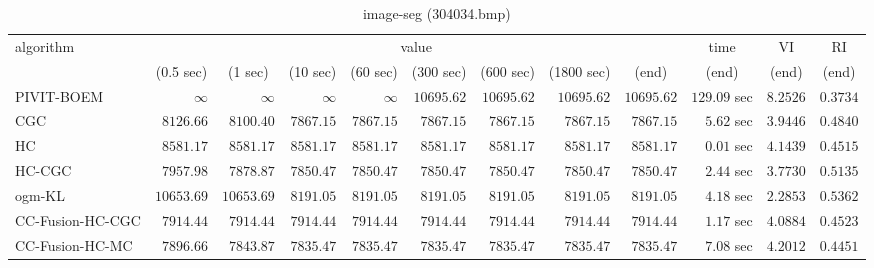 \begin{table}[H]
\scriptsize
\centering
\caption{image-seg (304034.bmp)}
\label{tab:anytimetable-image-seg-304034.bmp}
\begin{tabular}{lrrrrrrrrrrr}
\toprule
           algorithm &                                   \multicolumn{8}{c}{value} & \multicolumn{1}{c}{time}    & \multicolumn{1}{c}{VI}  & \multicolumn{1}{c}{RI} \\  
\cmidrule(lr){2-9}\cmidrule(lr){10-10} \cmidrule(lr){11-11} \cmidrule(lr){12-12}   
                     & \multicolumn{1}{c}{(0.5 sec)} & \multicolumn{1}{c}{(1 sec)} & \multicolumn{1}{c}{(10 sec)} & \multicolumn{1}{c}{(60 sec)} & \multicolumn{1}{c}{(300 sec)} & \multicolumn{1}{c}{(600 sec)} & \multicolumn{1}{c}{(1800 sec)} & \multicolumn{1}{c}{(end)} & \multicolumn{1}{c}{(end)}    & \multicolumn{1}{c}{(end)}   & \multicolumn{1}{c}{(end)}  \\ \midrule 
          PIVIT-BOEM & $\infty$ & $\infty$ & $\infty$ & $\infty$ & $     10695.62$ & $     10695.62$ & $     10695.62$ & $     10695.62$ & $       129.09$ sec    & $       8.2526$  & $       0.3734$ \\ 
                 CGC & $      8126.66$ & $      8100.40$ & $      7867.15$ & $      7867.15$ & $      7867.15$ & $      7867.15$ & $      7867.15$ & $      7867.15$ & $         5.62$ sec    & $       3.9446$  & $       0.4840$ \\ 
                  HC & $      8581.17$ & $      8581.17$ & $      8581.17$ & $      8581.17$ & $      8581.17$ & $      8581.17$ & $      8581.17$ & $      8581.17$ & $         0.01$ sec    & $       4.1439$  & $       0.4515$ \\ 
              HC-CGC & $      7957.98$ & $      7878.87$ & $      7850.47$ & $      7850.47$ & $      7850.47$ & $      7850.47$ & $      7850.47$ & $      7850.47$ & $         2.44$ sec    & $       3.7730$  & $       0.5135$ \\ 
              ogm-KL & $     10653.69$ & $     10653.69$ & $      8191.05$ & $      8191.05$ & $      8191.05$ & $      8191.05$ & $      8191.05$ & $      8191.05$ & $         4.18$ sec    & $       2.2853$  & $       0.5362$ \\ 
    CC-Fusion-HC-CGC & $      7914.44$ & $      7914.44$ & $      7914.44$ & $      7914.44$ & $      7914.44$ & $      7914.44$ & $      7914.44$ & $      7914.44$ & $         1.17$ sec    & $       4.0884$  & $       0.4523$ \\ 
     CC-Fusion-HC-MC & $      7896.66$ & $      7843.87$ & $      7835.47$ & $      7835.47$ & $      7835.47$ & $      7835.47$ & $      7835.47$ & $      7835.47$ & $         7.08$ sec    & $       4.2012$  & $       0.4451$ \\ 

\end{tabular}
\end{table}
